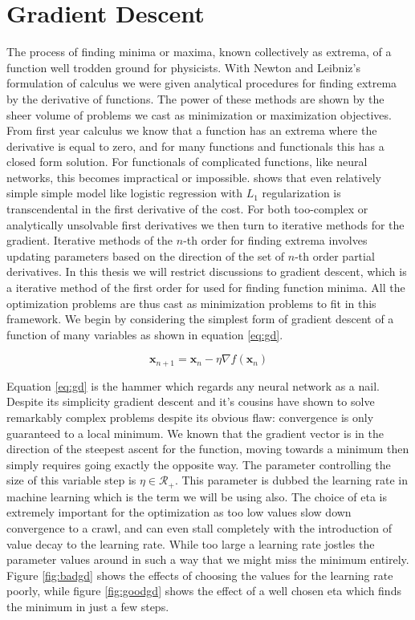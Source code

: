 \section{Gradient Descent}\label{sec:gd}

The process of finding minima or maxima, known collectively as extrema, of a function well trodden ground for physicists. With Newton and Leibniz's formulation of calculus we were given analytical procedures for finding extrema by the derivative of functions. The power of these methods are shown by the sheer volume of problems we cast as minimization or maximization objectives. From first year calculus we know that a function has an extrema where the derivative is equal to zero, and for many functions and functionals this has a closed form solution. For functionals of complicated functions, like neural networks, this becomes impractical or impossible. \citet{Mehta2019} shows that even relatively simple simple model like logistic regression with $L_1$ regularization is transcendental in the first derivative of the cost. For both too-complex or analytically unsolvable first derivatives we then turn to iterative methods for the gradient. Iterative methods of the $n$-th order for finding extrema involves updating parameters based on the direction of the set of $n$-th order partial derivatives. In this thesis we will restrict discussions to gradient descent, which is a iterative method of the first order for used for finding function minima. All the optimization problems are thus cast as minimization problems to fit in this framework. We begin by considering the simplest form of gradient descent of a function of many variables as shown in equation \ref{eq:gd}. 

\begin{equation}\label{eq:gd}
\mathbf{x}_{n+1} = \mathbf{x}_{n} - \eta \nabla f(\mathbf{x}_{n}) 
\end{equation} 

\noindent Equation \ref{eq:gd} is the hammer which regards any neural network as a nail. Despite its simplicity gradient descent and it's cousins have shown to solve remarkably complex problems despite its obvious flaw: convergence is only guaranteed to a local minimum. We known that the gradient vector is in the direction of the steepest ascent for the function, moving towards a minimum then simply requires going exactly the opposite way. The parameter controlling the size of this variable step is  $\eta \in \mathcal{R}_+$. This parameter is dubbed the learning rate in machine learning which is the term we will be using also. The choice of eta is extremely important for the optimization as too low values slow down convergence to a crawl, and can even stall completely with the introduction of value decay to the learning rate. While too large a learning rate jostles the parameter values around in such a way that we might miss the minimum entirely. Figure \ref{fig:badgd} shows the effects of choosing the values for the learning rate poorly, while figure \ref{fig:goodgd} shows the effect of a well chosen eta which finds the minimum in just a few steps. 


